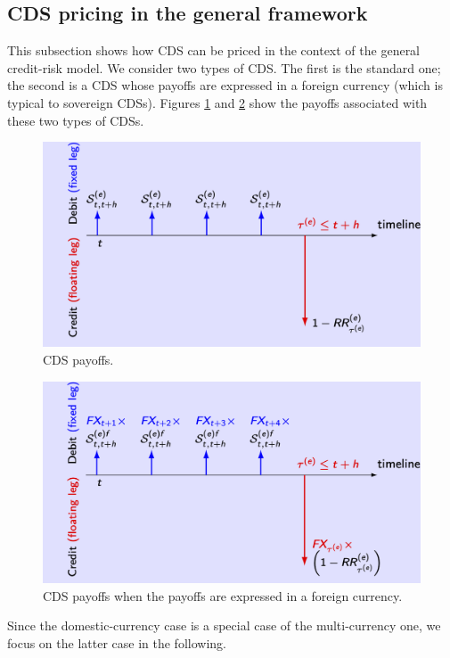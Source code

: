 \documentclass[
  12pt,
]{book}
\theoremstyle{definition}
\theoremstyle{definition}
\theoremstyle{definition}
\theoremstyle{definition}
\theoremstyle{remark}
\begin{document}
\hypertarget{CreditCDS}{%
\subsection{CDS pricing in the general framework}\label{CreditCDS}}

This subsection shows how CDS can be priced in the context of the general credit-risk model. We consider two types of CDS. The first is the standard one; the second is a CDS whose payoffs are expressed in a foreign currency (which is typical to sovereign CDSs). Figures \ref{fig:CDS} and \ref{fig:CDSFX} show the payoffs associated with these two types of CDSs.

\begin{figure}

{\centering \includegraphics[width=0.7\linewidth]{figures/FigureCDS} 

}

\caption{CDS payoffs.}\label{fig:CDS}
\end{figure}

\begin{figure}

{\centering \includegraphics[width=0.7\linewidth]{figures/FigureCDSFX} 

}

\caption{CDS payoffs when the payoffs are expressed in a foreign currency.}\label{fig:CDSFX}
\end{figure}

Since the domestic-currency case is a special case of the multi-currency one, we focus on the latter case in the following.
\end{document}
